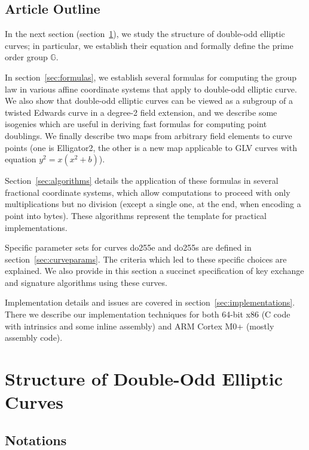 \documentclass{llncs}
\newcommand{\bG}{\mathbb{G}}
\begin{document}
\subsection{Article Outline}

In the next section (section~\ref{sec:structure}), we study the
structure of double-odd elliptic curves; in particular, we establish
their equation and formally define the prime order group $\bG$.

In section~\ref{sec:formulas}, we establish several formulas for
computing the group law in various affine coordinate systems that apply
to double-odd elliptic curve. We also show that double-odd elliptic
curves can be viewed as a subgroup of a twisted Edwards curve in a
degree-2 field extension, and we describe some isogenies which are
useful in deriving fast formulas for computing point doublings. We
finally describe two maps from arbitrary field elements to curve points
(one is Elligator2, the other is a new map applicable to GLV curves with
equation $y^2 = x(x^2 + b)$).

Section~\ref{sec:algorithms} details the application of these formulas
in several fractional coordinate systems, which allow computations to
proceed with only multiplications but no division (except a single one,
at the end, when encoding a point into bytes). These algorithms
represent the template for practical implementations.

Specific parameter sets for curves do255e and do255s are defined in
section~\ref{sec:curveparams}. The criteria which led to these specific
choices are explained. We also provide in this section a succinct
specification of key exchange and signature algorithms using these
curves.

Implementation details and issues are covered in
section~\ref{sec:implementations}. There we describe our implementation
techniques for both 64-bit x86 (C code with intrinsics and some inline
assembly) and ARM Cortex M0+ (mostly assembly code).


\section{Structure of Double-Odd Elliptic Curves}\label{sec:structure}

\subsection{Notations}\label{sec:structure:notations}
\end{document}
